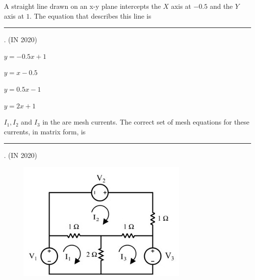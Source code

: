 \item A straight line drawn on an x-y plane intercepts the $X$ axis at $-0.5$ and the $Y$ axis at $1$. The equation that describes this line is \rule{1cm}{0.01pt}.
\hfill{(IN 2020)}
\begin{enumerate}
\begin{multicols}{4}
\item $y = -0.5 x + 1$
\item $y = x - 0.5$
\item $y = 0.5x - 1$
\item $y = 2x + 1$
\end{multicols}
\end{enumerate}
\item $I_1, I_2$ and $I_3$ in the  are mesh currents. The correct 
set of mesh equations for these currents, in matrix form, is \rule{1cm}{0.01pt}.
\hfill{(IN 2020)}
\begin{figure}[H]
\centering
\includegraphics[width=0.5\columnwidth]{GATE/2020/IN/figs/q13.jpg}
\caption{}
\label{fig:q13}
\end{figure}
